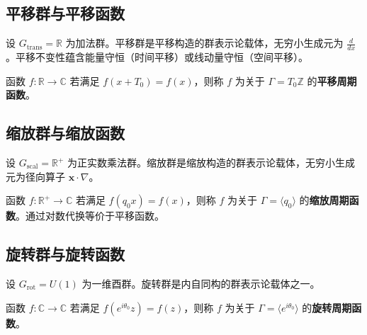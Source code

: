 \subsection{平移群与平移函数}

\begin{definition}[平移群]\label{def:translation_group_basic}
设 $G_{\text{trans}} = \mathbb{R}$ 为加法群。平移群是平移构造的群表示论载体，无穷小生成元为 $\frac{d}{dx}$。平移不变性蕴含能量守恒（时间平移）或线动量守恒（空间平移）。
\end{definition}

\begin{definition}[平移函数]\label{def:translation_function_basic}
函数 $f: \mathbb{R} \to \mathbb{C}$ 若满足 $f(x + T_0) = f(x)$，则称 $f$ 为关于 $\Gamma = T_0\mathbb{Z}$ 的\textbf{平移周期函数}。
\end{definition}

\subsection{缩放群与缩放函数}

\begin{definition}[缩放群]\label{def:scaling_group_basic}
设 $G_{\text{scal}} = \mathbb{R}^+$ 为正实数乘法群。缩放群是缩放构造的群表示论载体，无穷小生成元为径向算子 $\mathbf{x} \cdot \nabla$。
\end{definition}

\begin{definition}[缩放函数]\label{def:scaling_function_basic}
函数 $f: \mathbb{R}^+ \to \mathbb{C}$ 若满足 $f(q_0 x) = f(x)$，则称 $f$ 为关于 $\Gamma = \langle q_0 \rangle$ 的\textbf{缩放周期函数}。通过对数代换等价于平移函数。
\end{definition}

\subsection{旋转群与旋转函数}

\begin{definition}[旋转群]\label{def:rotation_group_basic}
设 $G_{\text{rot}} = U(1)$ 为一维酉群。旋转群是内自同构的群表示论载体之一。
\end{definition}

\begin{definition}[旋转函数]\label{def:rotation_function_basic}
函数 $f: \mathbb{C} \to \mathbb{C}$ 若满足 $f(e^{i\theta_0} z) = f(z)$，则称 $f$ 为关于 $\Gamma = \langle e^{i\theta_0} \rangle$ 的\textbf{旋转周期函数}。
\end{definition}

